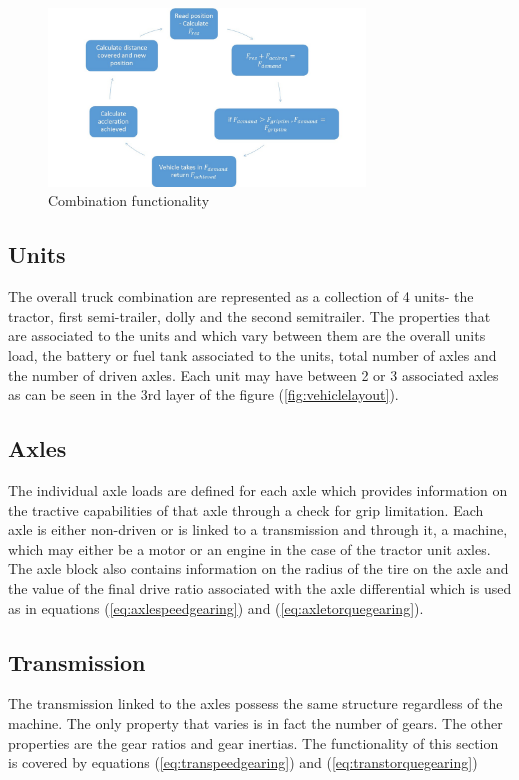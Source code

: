 \documentclass[ExampleMasters.tex]{subfiles}
\begin{document}
\begin{figure}
	\begin{center}
		\includegraphics[width=0.75\textwidth]{figures/VehicleModel/combinationfunction.jpg}
	\end{center}
	\caption{Combination functionality}
	\label{fig:combinationfunction}
\end{figure}

\subsection{Units}\label{sec:unitstructure}
The overall truck combination are represented as a collection of 4 units- the tractor, first semi-trailer, dolly and the second semitrailer. The properties that are associated to the units and which vary between them are the overall units load, the battery or fuel tank associated to the units, total number of axles and the number of driven axles. Each unit may have between 2 or 3 associated axles as can be seen in the 3rd layer of the figure (\ref{fig:vehiclelayout}). 

\subsection{Axles}\label{sec:axlestructure}
The individual axle loads are defined for each axle which provides information on the tractive capabilities of that axle through a check for grip limitation. Each axle is either non-driven or is linked to a transmission and through it, a machine, which may either be a motor or an engine in the case of the tractor unit axles. The axle block also contains information on the radius of the tire on the axle and the value of the final drive ratio associated with the axle differential which is used as in equations (\ref{eq:axlespeedgearing}) and (\ref{eq:axletorquegearing}).

\subsection{Transmission}\label{sec:transtructure}
The transmission linked to the axles possess the same structure regardless of the machine. The only property that varies is in fact the number of gears. The other properties are the gear ratios and gear inertias. The functionality of this section is covered by equations (\ref{eq:transpeedgearing}) and (\ref{eq:transtorquegearing})
\end{document}
